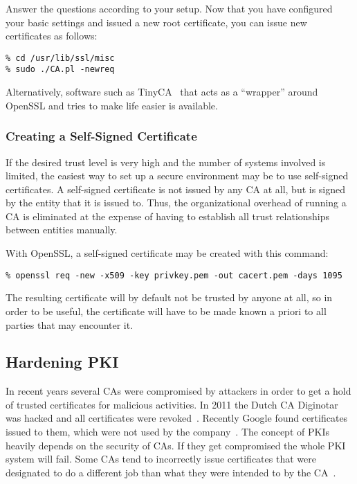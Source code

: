 Answer the questions according to your setup. Now that you have configured your basic settings and 
issued a new root certificate, you can issue new certificates as follows:

\begin{lstlisting}
% cd /usr/lib/ssl/misc
% sudo ./CA.pl -newreq
\end{lstlisting}

Alternatively, software such as TinyCA~\cite{Wikipedia:TinyCA} that
acts as a ``wrapper'' around OpenSSL and tries to make life easier is
available.

\subsubsection{Creating a Self-Signed Certificate}
\label{sec:pki:selfsignedcert}
If the desired trust level is very high and the number of systems involved
is limited, the easiest way to set up a secure environment may be to use
self-signed certificates.  A self-signed certificate is not issued by any
CA at all, but is signed by the entity that it is issued to.  Thus, the
organizational overhead of running a CA is eliminated at the expense of
having to establish all trust relationships between entities manually.

With OpenSSL, a self-signed certificate may be created with this command:

\begin{lstlisting}
% openssl req -new -x509 -key privkey.pem -out cacert.pem -days 1095
\end{lstlisting}

The resulting certificate will by default not be trusted by anyone at all,
so in order to be useful, the certificate will have to be made known a
priori to all parties that may encounter it.


\subsection{Hardening PKI}
\label{sec:hardeningpki}

In recent years several CAs were compromised by attackers in order to get a
hold of trusted certificates for malicious activities. In 2011 the Dutch CA
Diginotar was hacked and all certificates were revoked~\cite{diginotar-hack}.
Recently Google found certificates issued to them, which were not used by the
company~\cite{googlecahack}. The concept of PKIs heavily depends on the
security of CAs.  If they get compromised the whole PKI system will fail. Some
CAs tend to incorrectly issue certificates that were designated to do a
different job than what they were intended to by the CA~\cite{gocode}.

